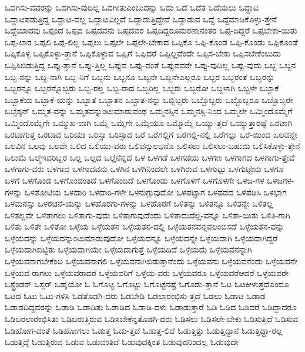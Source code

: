 {ಒದಗಿಸು-ವವರನ್ನು
ಒದಗಿಸು-ವುದಿಲ್ಲ
ಒದಗೀತುಎಂಬುದನ್ನು
ಒದು
ಒದೆ
ಒದೆತ
ಒದೆಯಲು
ಒದ್ದಾಟ
ಒದ್ದಾಟಪಡುತ್ತಿದ್ದ
ಒದ್ದಾಟ-ವಲ್ಲ
ಒದ್ದಾಟವಿಲ್ಲದೆ
ಒದ್ದಾಡುತ್ತಿದ್ದೇವೆ
ಒದ್ದಾಡುವ
ಒದ್ದೆ
ಒದ್ದೆಮಾಡಿಕೊಳ್ಳು-ತ್ತೇನೆ
ಒದ್ದೆಯಾದವು
ಒಪ್ಪಂದ
ಒಪ್ಪದ
ಒಪ್ಪದವನು
ಒಪ್ಪದವರ
ಒಪ್ಪದಿದ್ದರೂಮರಣಾನಂತರ
ಒಪ್ಪ-ದಿದ್ದರೆ
ಒಪ್ಪಬೇಕಾ-ಯಿತು
ಒಪ್ಪ-ಲಾರ
ಒಪ್ಪಲಿ
ಒಪ್ಪ-ಲಿಲ್ಲ
ಒಪ್ಪಲು
ಒಪ್ಪಲೇ
ಒಪ್ಪಲೇ-ಬೇಕಾದ
ಒಪ್ಪಿಕೊ
ಒಪ್ಪಿ-ಕೊಂಡ
ಒಪ್ಪಿ-ಕೊಂಡು
ಒಪ್ಪಿಕೊಂಡೆ
ಒಪ್ಪಿಕೊಳ್ಳ
ಒಪ್ಪಿಕೊಳ್ಳು-ತ್ತಾನೆ
ಒಪ್ಪಿಕೊಳ್ಳುವ
ಒಪ್ಪಿಗೆ
ಒಪ್ಪಿದರೆ
ಒಪ್ಪಿಲ್ಲವೆಂದೇ
ಒಪ್ಪಿಸ-ಬೇಕು
ಒಪ್ಪಿಸಬೇಕೆಂಬುದು
ಒಪ್ಪಿಸಿಬಿಡುತ್ತಿದ್ದ
ಒಪ್ಪು-ತ್ತಾನೆ
ಒಪ್ಪು-ತ್ತಿಲ್ಲ
ಒಪ್ಪುವ
ಒಪ್ಪು-ವಂತೆ
ಒಪ್ಪುವವರೇ
ಒಪ್ಪು-ವುದಿಲ್ಲ
ಒಪ್ಪು-ವುದು
ಒಬ್ಬ
ಒಬ್ಬನ
ಒಬ್ಬ-ನನ್ನು
ಒಬ್ಬ-ನಾಗಿ
ಒಬ್ಬ-ನಿಗೆ
ಒಬ್ಬನು
ಒಬ್ಬನೂ
ಒಬ್ಬನೇ
ಒಬ್ಬನೇಎಲ್ಲರೂ
ಒಬ್ಬರ
ಒಬ್ಬರಂತೆ
ಒಬ್ಬರನ್ನು
ಒಬ್ಬರನ್ನೂ
ಒಬ್ಬರನ್ನೊಬ್ಬರು
ಒಬ್ಬ-ರಲ್ಲ
ಒಬ್ಬ-ರಾದ
ಒಬ್ಬರಿಲ್ಲ
ಒಬ್ಬರು
ಒಬ್ಬರೋ
ಒಬ್ಬಳಾಗಿ
ಒಬ್ಬಳೇ
ಒಬ್ಬಾಕೆ
ಒಬ್ಬಾಕೆಯ
ಒಬ್ಬಾಕೆ-ಯನ್ನು
ಒಬ್ಬಾತ
ಒಬ್ಬಾತನ
ಒಬ್ಬಾತ-ನನ್ನು
ಒಬ್ಬಿಬ್ಬರು
ಒಬ್ಬೊಬ್ಬರು
ಒಬ್ಬೊಬ್ಬರೂ
ಒಬ್ಬೊಬ್ಬರೇ
ಒಬ್ಸೆಶ್ಶನ್
ಒಮ್ಮತ-ವನ್ನು
ಒಮ್ಮತವನ್ನುಂಟುಮಾಡುವಂಥ
ಒಮ್ಮನಸ್ಸಿನ
ಒಮ್ಮನಸ್ಸಿ-ನಿಂದ
ಒಮ್ಮಲೇ
ಒಮ್ಮಿಂದೊಮ್ಮೆಗೆ
ಒಮ್ಮಿಂದೊಮ್ಮೆಗೇ
ಒಮ್ಮುಖ-ವಾಗಿ
ಒಮ್ಮೆ
ಒಮ್ಮೆಗೇ
ಒಮ್ಮೆಯೂ
ಒಮ್ಮೊಮ್ಮೆ
ಒಯ್ಯು-ತ್ತದೆ
ಒಯ್ಯುತ್ತಾರಷ್ಟೆ
ಒರಟಾಗಿ
ಒರಟಾಗುತ್ತ
ಒರಟಾದ
ಒರಿಯಾ
ಒರಿಸ್ಸಾ
ಒರಿಸ್ಸಾದ
ಒರೆ
ಒರೆಗಲ್ಲಿಗೆ
ಒರೆಗಲ್ಲಿ-ನಲ್ಲಿ
ಒರೆಗಲ್ಲು
ಒರೆ-ಯಿಂದ
ಒಲವನ್ನೇ
ಒಲವಿನ
ಒಲವು
ಒಲವೇ
ಒಲಿದ
ಒಲಿಯು-ವರು
ಒಲಿವನ್ಸುಲಭನೊ
ಒಲಿಸಲು
ಒಲಿಸಲು-ಬಹುದು
ಒಲಿಸಿಕೊಳ್ಳು-ತ್ತೇನೆ
ಒಲುಮೆ
ಒಲ್ಮೆಇವರಿಬ್ಬರ
ಒಲ್ಲ
ಒಲ್ಲದ
ಒಲ್ಲೆನೆನ್ನದೆ
ಒಳ
ಒಳಗಡೆ
ಒಳಗಡೆಯ
ಒಳಗಣ
ಒಳಗಾಗದ
ಒಳಗಾಗು-ತ್ತೇವೆ
ಒಳಗಾಗು-ವರು
ಒಳಗಾದ
ಒಳಗಾದವನು
ಒಳಗಿನ
ಒಳಗಿನಿಂದಲೇ
ಒಳಗಿರುವ
ಒಳಗುಟ್ಟು
ಒಳಗುಟ್ಟೇನು
ಒಳಗೂ
ಒಳಗೆ
ಒಳಗೊಂಡ
ಒಳಗೊಂಡಂತಿದೆ
ಒಳಗೊಂಡಿದೆ
ಒಳಗೊಂಡು
ಒಳಗೊಳಗೆ
ಒಳಗೊಳಗೇ
ಒಳಜ-ಗಳ
ಒಳಜಗಳ-ಗಳನ್ನು
ಒಳತೋಟಿಯ
ಒಳದಾರಿ
ಒಳದಾರಿ-ಗಳೇ
ಒಳನುಗ್ಗುವುದೋ
ಒಳಪಟ್ಟಾಗ
ಒಳಪಡದ
ಒಳಪಡಿಸಿ
ಒಳಭಾಗ
ಒಳಮನಸ್ಸು
ಒಳರಚನೆ-ಯನ್ನು
ಒಳಹೊರಗು-ಗಳನ್ನು
ಒಳಹೊರಗೆ
ಒಳಿತನ್ನು
ಒಳಿತನ್ನೂ
ಒಳಿತನ್ನೇ
ಒಳಿತಲ್ಲ
ಒಳಿತಲ್ಲವೇ
ಒಳಿತಾಗಲು
ಒಳಿತಾಗು-ವುದು
ಒಳಿತಾಗುವುದೆಂದು
ಒಳಿತಾದುದೆಲ್ಲ-ವನ್ನೂ
ಒಳಿತಾ-ಯಿತು
ಒಳಿತಿ-ಗಾಗಿ
ಒಳಿತು
ಒಳಿತೇ
ಒಳಿತೋ
ಒಳ್ಳೆಯ
ಒಳ್ಳೆಯತನ
ಒಳ್ಳೆಯತನ-ದಲ್ಲಿ
ಒಳ್ಳೆಯತನವನ್ನವಲಂಬಿಸದೆ
ಒಳ್ಳೆಯತನ-ವನ್ನು
ಒಳ್ಳೆಯದನ್ನು
ಒಳ್ಳೆಯದನ್ನುಂಟುಮಾಡುವುದೋ
ಒಳ್ಳೆಯದನ್ನೂ
ಒಳ್ಳೆಯದನ್ನೇ
ಒಳ್ಳೆಯದಾಗಿ
ಒಳ್ಳೆಯದಾಗಿದ್ದರೆ
ಒಳ್ಳೆಯದಾಗಿಬಿಟ್ಟಿತು
ಒಳ್ಳೆಯದಾಗಿಯೇ
ಒಳ್ಳೆಯದಾಗುತ್ತೆ
ಒಳ್ಳೆಯದಿದೆ
ಒಳ್ಳೆಯದು
ಒಳ್ಳೆಯವನನ್ನಾಗಿ
ಒಳ್ಳೆಯವನಾಗಬೇಕೆಂಬ
ಒಳ್ಳೆಯವನಾಗಲಿ
ಒಳ್ಳೆಯವನಾಗಿಬಿಡುತ್ತಾನೆಂದು
ಒಳ್ಳೆಯವನು
ಒಳ್ಳೆಯವನೆಂದು
ಒಳ್ಳೆಯವನೇ
ಒಳ್ಳೆಯವ-ರಾಗಲು
ಒಳ್ಳೆಯವರಾದರೆ
ಒಳ್ಳೆಯವರಿಗೆ
ಒಳ್ಳೆಯ-ವರು
ಒಳ್ಳೆಯವರೂ
ಒಳ್ಳೆಯವರೆಆದರೆ
ಒಳ್ಳೆಯವರೇ
ಒಸ್ಟ್ರೆಂಡರ್
ಒಸ್ಲರ್
ಒಹೈಯೋ
ಓ
ಓಗೊಟ್ಟ
ಓಗೊಟ್ಟು
ಓಗೊಟ್ಟೆನಷ್ಟೆ
ಓಗೊಡು-ತ್ತಾನೆ
ಓಟ
ಓಟಕೀಳುತ್ತದೆಎಂದೂ
ಓಟದ
ಓಟು
ಓಟು-ಗಳಿಸಿ
ಓಡತೊಡಗಿ-ದರು
ಓಡಬೇಡಿ
ಓಡಲಾರಂಭಿಸು-ತ್ತದೆ
ಓಡಲು
ಓಡಾಟ
ಓಡಾಡ
ಓಡಾಡದಿದ್ದವರನ್ನು
ಓಡಾಡಿ
ಓಡಾಡಿತು
ಓಡಾಡಿದ
ಓಡಾಡಿ-ದಳು
ಓಡಾಡುತ್ತಾರೆ
ಓಡಿ
ಓಡಿದ
ಓಡಿದರೆ
ಓಡಿದ್ದಾದರೂ
ಓಡಿಬರಲಾರಂಭಿಸಿತು
ಓಡಿಬರುತ್ತಿರುವ
ಓಡಿಸಬೇಕೆನ್ನತೊಡಗಿ-ದರು
ಓಡಿಸಲು
ಓಡಿಸಲೇ-ಬೇಕು
ಓಡಿಸುತ್ತಿದೆ
ಓಡಿಸುವ
ಓಡಿಹೋಗ-ದಂತೆ
ಓಡಿಹೋಗಲು
ಓಡುತ್ತ
ಓಡು-ತ್ತದೆ
ಓಡುತ್ತ-ಲಿದೆ
ಓಡುತ್ತಿತ್ತು
ಓಡುತ್ತಿದ್ದಾನೆ
ಓಡುತ್ತಿದ್ದಾ-ರಲ್ಲ
ಓಡುತ್ತಿದ್ದೆ
ಓಡುತ್ತಿರುವ
ಓಡುವ
ಓಡುವಂತಿದೆ
ಓಡುವುದಕ್ಕಿಂತ
ಓಡುವುದರಿಂದಲ್ಲ
ಓಡುವುದೇ
}
